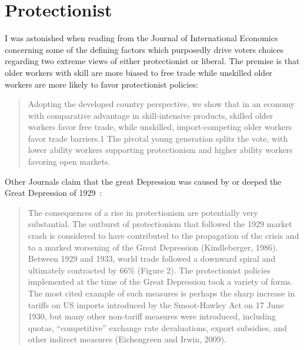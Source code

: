 \documentclass[pdftex,12pt,a4paper]{report}
\begin{document}
\section{Protectionist}
\begin{doublespace}
I was astonished when reading from the Journal of International Economics~\citep*{blanchard2011escaping} concerning some of the defining factors which purposedly drive voters choices regarding two extreme views of either protectionist  or liberal. The premise is that older workers with skill are more biased to free trade while unskilled older workers are more likely to favor protectionist policies:
\end{doublespace}
\begin{quote}
Adopting the developed country perspective, we show that in an economy with comparative advantage in skill-intensive products, skilled older workers favor free trade, while unskilled, import-competing older workers favor trade barriers.1 The pivotal young generation splits the vote, with lower ability workers supporting protectionism and higher ability workers favoring open markets.
\end{quote}
\begin{doublespace}
Other Journals claim that the great Depression was caused by or deeped the Great Depression of 1929~\citep*{bussière2011protectionist}:
\end{doublespace}
\begin{quote}
The consequences of a rise in protectionism are potentially very substantial. The outburst of protectionism that followed the 1929 market crash is considered to have contributed to the propagation of the crisis and to a marked worsening of the Great Depression (Kindleberger, 1986). Between 1929 and 1933, world trade followed a downward spiral and ultimately contracted by 66\% (Figure 2). The protectionist policies implemented at the time of the Great Depression took a variety of forms. The most cited example of such measures is perhaps the sharp increase in tariffs on US imports introduced by the Smoot-Hawley Act on 17 June 1930, but many other non-tariff measures were introduced, including quotas, “competitive” exchange rate devaluations, export subsidies, and other indirect measures (Eichengreen and Irwin, 2009).
\end{quote}
\end{document}
